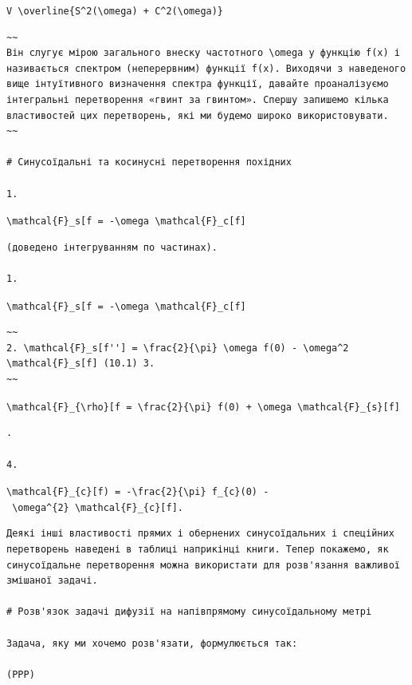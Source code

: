 \documentclass[
  ukrainian,
]{article}
\begin{document}
\texttt{V\ \textbackslash{}overline\{S\^{}2(\textbackslash{}omega)\ +\ C\^{}2(\textbackslash{}omega)\}}

\begin{verbatim}
~~
Він слугує мірою загального внеску частотного \omega у функцію f(x) і називається спектром (неперервним) функції f(x). Виходячи з наведеного вище інтуїтивного визначення спектра функції, давайте проаналізуємо інтегральні перетворення «гвинт за гвинтом». Спершу запишемо кілька властивостей цих перетворень, які ми будемо широко використовувати.
~~

# Синусоїдальні та косинусні перетворення похідних

1.
\end{verbatim}

\texttt{\textbackslash{}mathcal\{F\}\_s{[}f\textquotesingle{}{]}\ =\ -\textbackslash{}omega\ \textbackslash{}mathcal\{F\}\_c{[}f{]}}

\begin{verbatim}
(доведено інтегруванням по частинах).

1.
\end{verbatim}

\texttt{\textbackslash{}mathcal\{F\}\_s{[}f\textquotesingle{}{]}\ =\ -\textbackslash{}omega\ \textbackslash{}mathcal\{F\}\_c{[}f{]}}

\begin{verbatim}
~~
2. \mathcal{F}_s[f''] = \frac{2}{\pi} \omega f(0) - \omega^2 \mathcal{F}_s[f] (10.1) 3.
~~
\end{verbatim}

\texttt{\textbackslash{}mathcal\{F\}\_\{\textbackslash{}rho\}{[}f\textquotesingle{}{]}\ =\ \textbackslash{}frac\{2\}\{\textbackslash{}pi\}\ f(0)\ +\ \textbackslash{}omega\ \textbackslash{}mathcal\{F\}\_\{s\}{[}f{]}}

\begin{verbatim}
.

4.
\end{verbatim}

\texttt{\textbackslash{}mathcal\{F\}\_\{c\}{[}f\textquotesingle{}\textquotesingle{})\ =\ -\textbackslash{}frac\{2\}\{\textbackslash{}pi\}\ f\_\{c\}(0)\ -\ \textbackslash{}omega\^{}\{2\}\ \textbackslash{}mathcal\{F\}\_\{c\}{[}f{]}.}

\begin{verbatim}
Деякі інші властивості прямих і обернених синусоїдальних і спеційних перетворень наведені в таблиці наприкінці книги. Тепер покажемо, як синусоїдальне перетворення можна використати для розв'язання важливої змішаної задачі.

# Розв'язок задачі дифузії на напівпрямому синусоїдальному метрі

Задача, яку ми хочемо розв'язати, формулюється так:

(PPP)
\end{verbatim}
\end{document}
